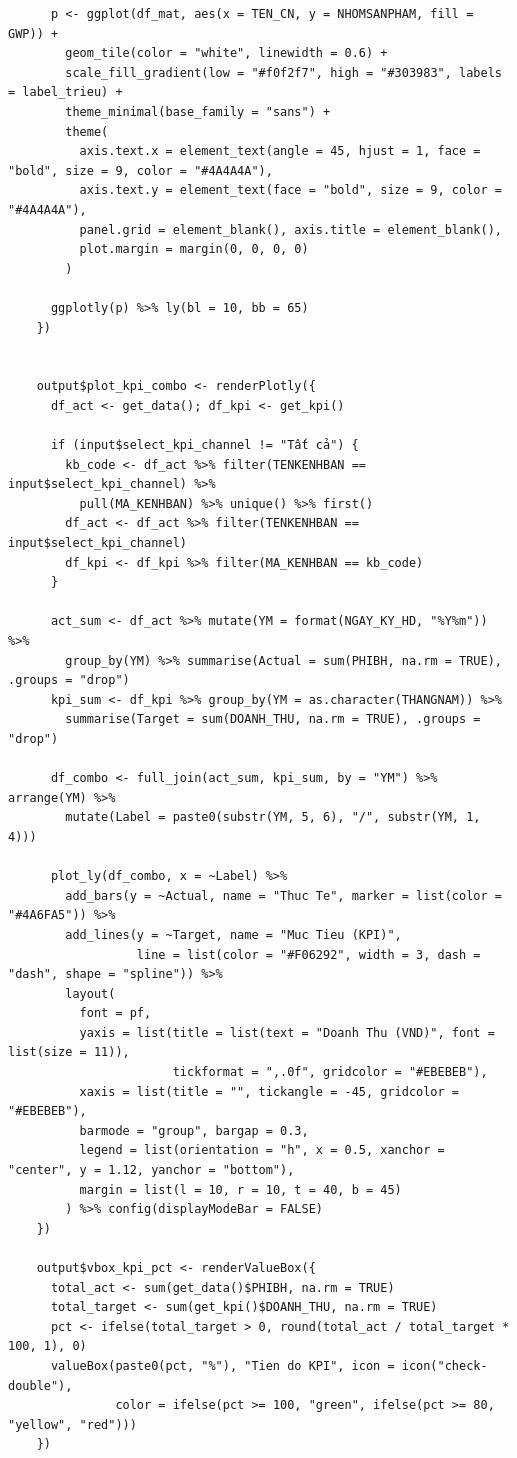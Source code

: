 \documentclass[12pt, a4paper]{article}
\begin{document}
\begin{lstlisting}
      p <- ggplot(df_mat, aes(x = TEN_CN, y = NHOMSANPHAM, fill = GWP)) +
        geom_tile(color = "white", linewidth = 0.6) +
        scale_fill_gradient(low = "#f0f2f7", high = "#303983", labels = label_trieu) +
        theme_minimal(base_family = "sans") +
        theme(
          axis.text.x = element_text(angle = 45, hjust = 1, face = "bold", size = 9, color = "#4A4A4A"),
          axis.text.y = element_text(face = "bold", size = 9, color = "#4A4A4A"),
          panel.grid = element_blank(), axis.title = element_blank(),
          plot.margin = margin(0, 0, 0, 0)
        )

      ggplotly(p) %>% ly(bl = 10, bb = 65)
    })


    output$plot_kpi_combo <- renderPlotly({
      df_act <- get_data(); df_kpi <- get_kpi()

      if (input$select_kpi_channel != "Tất cả") {
        kb_code <- df_act %>% filter(TENKENHBAN == input$select_kpi_channel) %>%
          pull(MA_KENHBAN) %>% unique() %>% first()
        df_act <- df_act %>% filter(TENKENHBAN == input$select_kpi_channel)
        df_kpi <- df_kpi %>% filter(MA_KENHBAN == kb_code)
      }

      act_sum <- df_act %>% mutate(YM = format(NGAY_KY_HD, "%Y%m")) %>%
        group_by(YM) %>% summarise(Actual = sum(PHIBH, na.rm = TRUE), .groups = "drop")
      kpi_sum <- df_kpi %>% group_by(YM = as.character(THANGNAM)) %>%
        summarise(Target = sum(DOANH_THU, na.rm = TRUE), .groups = "drop")

      df_combo <- full_join(act_sum, kpi_sum, by = "YM") %>% arrange(YM) %>%
        mutate(Label = paste0(substr(YM, 5, 6), "/", substr(YM, 1, 4)))

      plot_ly(df_combo, x = ~Label) %>%
        add_bars(y = ~Actual, name = "Thuc Te", marker = list(color = "#4A6FA5")) %>%
        add_lines(y = ~Target, name = "Muc Tieu (KPI)",
                  line = list(color = "#F06292", width = 3, dash = "dash", shape = "spline")) %>%
        layout(
          font = pf,
          yaxis = list(title = list(text = "Doanh Thu (VND)", font = list(size = 11)),
                       tickformat = ",.0f", gridcolor = "#EBEBEB"),
          xaxis = list(title = "", tickangle = -45, gridcolor = "#EBEBEB"),
          barmode = "group", bargap = 0.3,
          legend = list(orientation = "h", x = 0.5, xanchor = "center", y = 1.12, yanchor = "bottom"),
          margin = list(l = 10, r = 10, t = 40, b = 45)
        ) %>% config(displayModeBar = FALSE)
    })

    output$vbox_kpi_pct <- renderValueBox({
      total_act <- sum(get_data()$PHIBH, na.rm = TRUE)
      total_target <- sum(get_kpi()$DOANH_THU, na.rm = TRUE)
      pct <- ifelse(total_target > 0, round(total_act / total_target * 100, 1), 0)
      valueBox(paste0(pct, "%"), "Tien do KPI", icon = icon("check-double"),
               color = ifelse(pct >= 100, "green", ifelse(pct >= 80, "yellow", "red")))
    })



\end{lstlisting}
\end{document}
